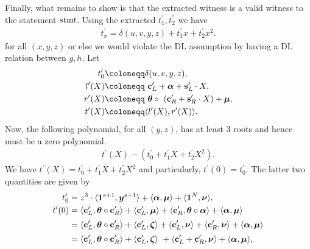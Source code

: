 Finally, what remains to show is that the extracted witness is a valid witness to the statement $\textsl{stmt}$. Using the extracted $t_1^{\prime}, t_2^{\prime}$ we have
\begin{gather*}
    t_{x}^{\prime} = \delta(u,v,y, z) + t_1^{\prime}x + t_2^{\prime}x^2.
\end{gather*}
for all $(x,y,z)$ or else we would violate the DL assumption by having a DL relation between $g,h$. Let
\begin{align*}
    t_0^{\prime} &\coloneqq \delta(u,v,y, z), \\
    l^{\prime}(X) &\coloneqq \ \textbf{c}_L^{\prime} + \vecnb{\alpha} + \textbf{s}_L^{\prime} \cdot X ,
    \\
    r^{\prime}(X) &\coloneqq \ \vecnb{\theta} \circ \ (\textbf{c}_R^{\prime} + \textbf{s}_R^{\prime} \cdot X) + \vecnb{\mu},
    \\
    t^{\prime}(X) &\coloneqq \langle l^{\prime}(X),r^{\prime}(X) \rangle.
\end{align*}
Now, the following polynomial, for all $(y,z)$, has at least 3 roots and hence must be a zero polynomial.
\begin{align*}
    t^{\prime}(X) - (t_0^{\prime} + t_1^{\prime}X + t_2^{\prime}X^2).
\end{align*}
We have $t^{\prime}(X) = t_0^{\prime} + t_1^{\prime}X + t_2^{\prime}X^2 $ and particularly, $t^{\prime}(0) = t_0^{\prime}$. The latter two quantities are given by 
\begin{align}
    t_0^{\prime} &= z^3 \cdot \langle {\boldsymbol{1}}^{s+1}, {\boldsymbol{y}}^{s+1} \rangle + \langle {\boldsymbol{\alpha}}, {\boldsymbol{\mu}} \rangle + \langle {\boldsymbol{1}}^N, {\boldsymbol{\nu}}\rangle, \label{label:t0}\\
    t^{\prime}(0) &= 
    \langle \textbf{c}_L^{\prime}, {\boldsymbol{\theta}} \circ \textbf{c}_R^{\prime} \rangle + 
    \langle \textbf{c}_L^{\prime}, {\boldsymbol{\mu}} \rangle
    +
    \langle \textbf{c}_R^{\prime}, {\boldsymbol{\theta}} \circ {\boldsymbol{\alpha}} \rangle
    +
    \langle {\boldsymbol{\alpha}}, {\boldsymbol{\mu}} \rangle \nonumber \\[2pt]
    &=
    \langle \textbf{c}_L^{\prime}, {\boldsymbol{\theta}} \circ \textbf{c}_R^{\prime} \rangle + 
    \langle \textbf{c}_L^{\prime}, {\boldsymbol{\zeta}} \rangle
    + 
    \langle \textbf{c}_L^{\prime}, {\boldsymbol{\nu}} \rangle
    +
    \langle \textbf{c}_R^{\prime}, {\boldsymbol{\nu}} \rangle
    +
    \langle {\boldsymbol{\alpha}}, {\boldsymbol{\mu}} \rangle \nonumber\\[2pt]
    &=
    \langle \textbf{c}_L^{\prime}, {\boldsymbol{\theta}} \circ \textbf{c}_R^{\prime} \rangle + 
    \langle \textbf{c}_L^{\prime}, {\boldsymbol{\zeta}} \rangle \ +
    \langle \textbf{c}_L^{\prime}+\textbf{c}_R^{\prime}, {\boldsymbol{\nu}} \rangle
    +
    \langle {\boldsymbol{\alpha}}, {\boldsymbol{\mu}} \rangle, \label{label:tX0}
\end{align}
